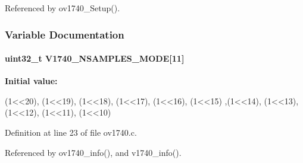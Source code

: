 Referenced by ov1740\_\-Setup().

\subsubsection{Variable Documentation}
\paragraph[{V1740\_\-NSAMPLES\_\-MODE}]{\setlength{\rightskip}{0pt plus 5cm}uint32\_\-t {\bf V1740\_\-NSAMPLES\_\-MODE}\mbox{[}11\mbox{]}}\hfill\label{ov1740_8c_a78b75f453b30a36664143259097a05cd}
{\bfseries Initial value:}
\begin{DoxyCode}
 { (1<<20), (1<<19), (1<<18), (1<<17), (1<<16), (1<<15)
              ,(1<<14), (1<<13), (1<<12), (1<<11), (1<<10)}
\end{DoxyCode}


Definition at line 23 of file ov1740.c.

Referenced by ov1740\_\-info(), and v1740\_\-info().